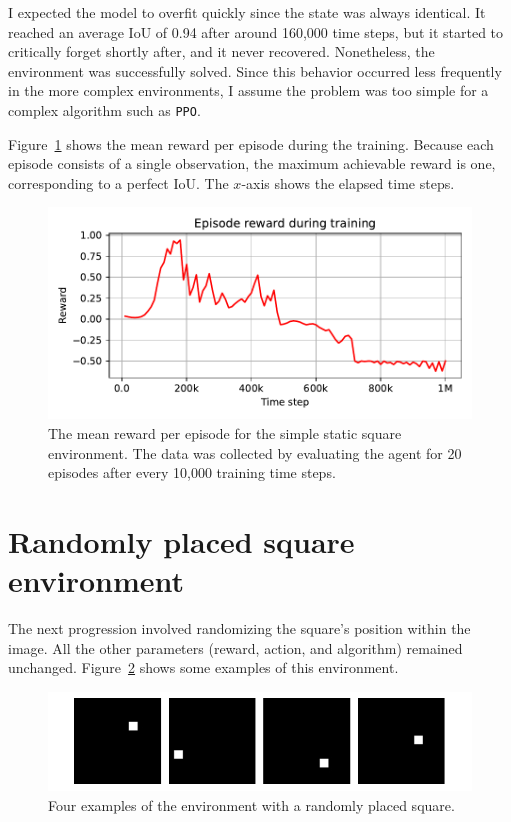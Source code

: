 \documentclass[
  digital,     %
  oneside,     %
  nosansbold,  %
  nocolorbold, %
  lof,         %
  lot,         %
]{fithesis4}
\begin{document}
I expected the model to overfit quickly since the state was always identical. It reached an average IoU of 0.94 after around 160,000 time steps, but it started to critically forget shortly after, and it never recovered. Nonetheless, the environment was successfully solved. Since this behavior occurred less frequently in the more complex environments, I assume the problem was too simple for a complex algorithm such as \texttt{PPO}.

Figure~\ref{fig:v0_rew} shows the mean reward per episode during the training. Because each episode consists of a single observation, the maximum achievable reward is one, corresponding to a perfect IoU. The $x$-axis shows the elapsed time steps.

\begin{figure}
    \includegraphics[width=1\linewidth]{graphs/v0.pdf}
    \caption{The mean reward per episode for the simple static square environment. The data was collected by evaluating the agent for 20 episodes after every 10,000 training time steps.}
    \label{fig:v0_rew}
\end{figure}

\section{Randomly placed square environment}
The next progression involved randomizing the square's position within the image. All the other parameters (reward, action, and algorithm) remained unchanged. Figure~\ref{fig:env1} shows some examples of this environment.

\begin{figure}
    \includegraphics[width=1\linewidth]{env_examples/env1.pdf}
    \caption{Four examples of the environment with a randomly placed square.}
    \label{fig:env1}
\end{figure}
\end{document}
